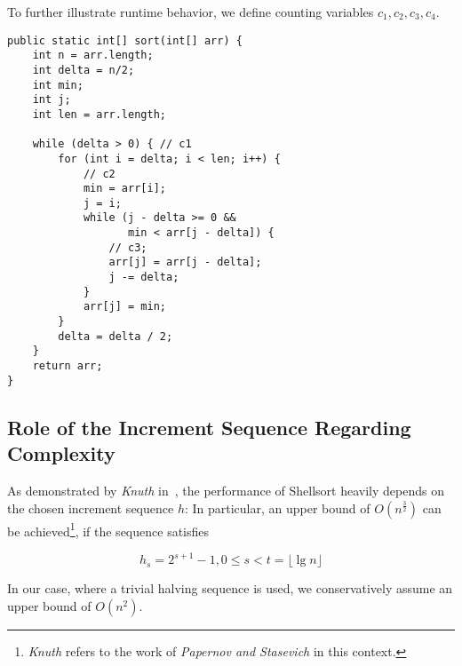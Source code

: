 To further illustrate runtime behavior, we define counting variables $c_1, c_2, c_3, c_4$.

\vspace{4mm}
\begin{lstlisting}[style=javastyle, caption={Shellsort implementation using halving sequences. }, label=lst:shell]
public static int[] sort(int[] arr) {
    int n = arr.length;
    int delta = n/2;
    int min;
    int j;
    int len = arr.length;

    while (delta > 0) { // c1
        for (int i = delta; i < len; i++) {
            // c2
            min = arr[i];
            j = i;
            while (j - delta >= 0 &&
                   min < arr[j - delta]) {
                // c3;
                arr[j] = arr[j - delta];
                j -= delta;
            }
            arr[j] = min;
        }
        delta = delta / 2;
    }
    return arr;
}
\end{lstlisting}
\vspace{4mm}


\subsection{Role of the Increment Sequence Regarding Complexity}

As demonstrated by \textit{Knuth} in~\cite[91]{Knu97b}, the performance of Shellsort heavily  depends on the chosen increment sequence $h$: In particular, an upper bound of $O(n^{\frac{3}{2}})$ can be achieved\footnote{
\textit{Knuth} refers to the work of \textit{Papernov and Stasevich} \cite{PS65} in this context.
}, if the sequence satisfies

\[
    h_s = 2^{s+1} - 1, 0 \leq s < t = \lfloor{\lg n} \rfloor
\]

\noindent
In our case, where a trivial halving sequence is used, we conservatively assume an upper bound of $O(n^2)$.
